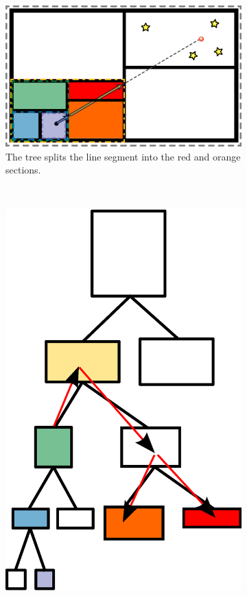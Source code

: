 \begin{figure}
        \centering
        \begin{subfigure}[b]{0.45\textwidth}
                \includegraphics[width=\textwidth]{graphics/refinement.eps}
                \caption{The tree splits the line segment into the red and orange sections.}
                \label{fig:refinetree}
        \end{subfigure}
        ~ 
        \begin{subfigure}[b]{0.45\textwidth}
                \includegraphics[width=\textwidth]{graphics/refine_memory.eps}

\end{subfigure}
\end{figure}
